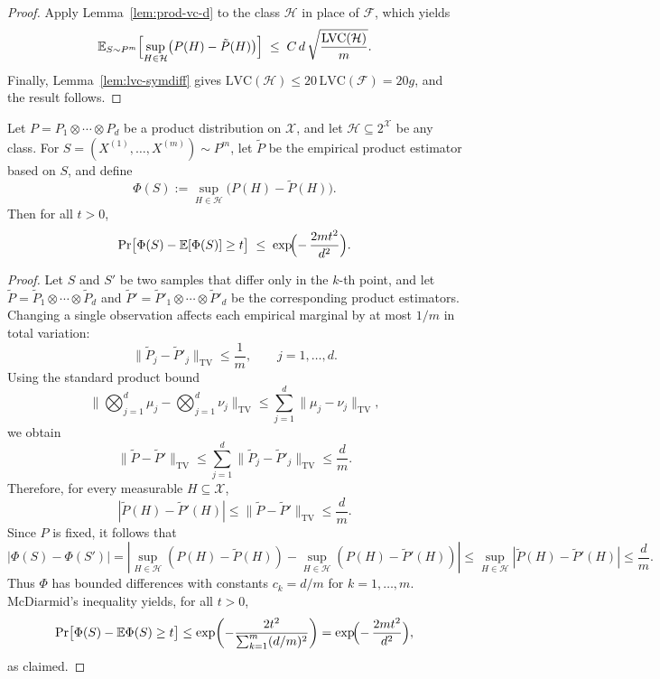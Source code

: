 \documentclass[arxiv]{colt2026}
\newcommand{\X}{\mathcal{X}}
\newcommand{\F}{\mathcal{F}}
\newcommand{\Hc}{\mathcal{H}}
\newcommand{\E}{\mathbb{E}}
\newcommand{\LVC}{\mathrm{LVC}}
\begin{document}
\begin{proof}

Apply Lemma~\ref{lem:prod-vc-d} to the class $\Hc$ in place of $\F$, which yields
\[
\E_{S\sim P^{m}}
\Bigl[
\sup_{H\in \Hc} \bigl(P(H) - \tilde P(H)\bigr)
\Bigr]
\;\le\;
C\,d\,\sqrt{\frac{\LVC(\Hc)}{m}}.
\]
Finally, Lemma~\ref{lem:lvc-symdiff} gives $\LVC(\Hc)\le 20\,\LVC(\F)=20g$,
and the result follows.
\end{proof}



\begin{lemma}\label{lem:mcdiarmid-prod-sup}
Let $P=P_1\otimes\cdots\otimes P_d$ be a product distribution on $\X$,
and let $\Hc\subseteq 2^\X$ be any class.
For $S=(X^{(1)},\dots,X^{(m)})\sim P^{m}$, let $\tilde P$ be the
empirical product estimator based on $S$, and define
\[
\Phi(S) := \sup_{H\in\Hc}\bigl(P(H)-\tilde P(H)\bigr).
\]
Then for all $t>0$,
\[
\Pr\bigl[\Phi(S)-\E[\Phi(S)] \ge t \bigr]
\;\le\;
\exp\!\Bigl(-\,\frac{2 m t^2}{d^2}\Bigr).
\]
\end{lemma}

\begin{proof}
Let $S$ and $S'$ be two samples that differ only in the $k$-th point, and let
$\tilde P=\tilde P_1\otimes\cdots\otimes\tilde P_d$ and
$\tilde P'=\tilde P'_1\otimes\cdots\otimes\tilde P'_d$
be the corresponding product estimators.
Changing a single observation affects each empirical marginal by at most $1/m$
in total variation:
\[
\|\tilde P_j-\tilde P'_j\|_{\mathrm{TV}} \le \frac{1}{m},
\qquad j=1,\dots,d.
\]
Using the standard product bound
\[
\bigl\|\textstyle\bigotimes_{j=1}^d \mu_j-\bigotimes_{j=1}^d \nu_j\bigr\|_{\mathrm{TV}}
\le \sum_{j=1}^d \|\mu_j-\nu_j\|_{\mathrm{TV}},
\]
we obtain
\[
\|\tilde P-\tilde P'\|_{\mathrm{TV}}
\le \sum_{j=1}^d \|\tilde P_j-\tilde P'_j\|_{\mathrm{TV}}
\le \frac{d}{m}.
\]
Therefore, for every measurable $H\subseteq\X$,
\[
|\tilde P(H)-\tilde P'(H)| \le \|\tilde P-\tilde P'\|_{\mathrm{TV}} \le \frac{d}{m}.
\]
Since $P$ is fixed, it follows that
\[
|\Phi(S)-\Phi(S')|
=
\left|
\sup_{H\in\Hc}(P(H)-\tilde P(H))
-\sup_{H\in\Hc}(P(H)-\tilde P'(H))
\right|
\le
\sup_{H\in\Hc}|\tilde P(H)-\tilde P'(H)|
\le \frac{d}{m}.
\]
Thus $\Phi$ has bounded differences with constants $c_k=d/m$ for $k=1,\dots,m$.
McDiarmid's inequality yields, for all $t>0$,
\[
\Pr\bigl[\Phi(S)-\E\Phi(S)\ge t\bigr]
\le
\exp\!\left(
-\frac{2t^2}{\sum_{k=1}^m (d/m)^2}
\right)
=
\exp\!\Bigl(-\,\frac{2 m t^2}{d^2}\Bigr),
\]
as claimed.
\end{proof}
\end{document}
